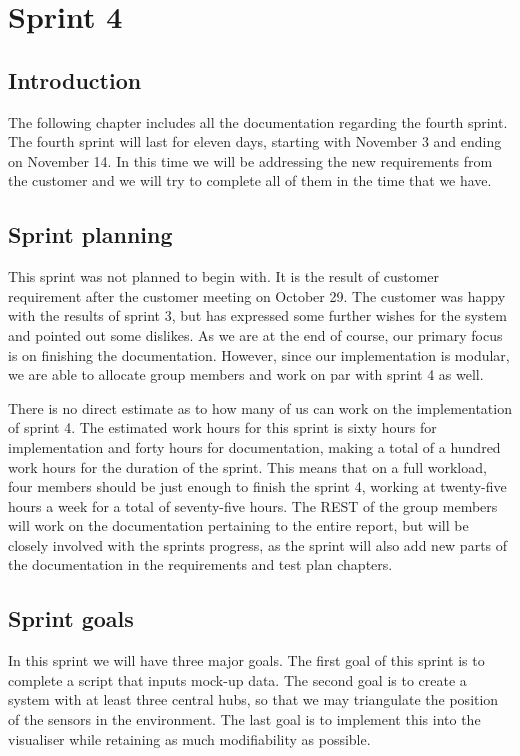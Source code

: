 \documentclass[../document]{subfiles}
\begin{document}
\section{Sprint 4}

\subsection{Introduction}

The following chapter includes all the documentation regarding the fourth sprint. The fourth sprint will last for eleven days, starting with November 3 and ending on November 14. In this time we will be addressing the new requirements from the customer and we will try to complete all of them in the time that we have. 

\subsection{Sprint planning}

This sprint was not planned to begin with. It is the result of customer requirement after the customer meeting on October 29. The customer was happy with the results of sprint 3, but has expressed some further wishes for the system and pointed out some dislikes. As we are at the end of course, our primary focus is on finishing the documentation. However, since our implementation is modular, we are able to allocate group members and work on par with sprint 4 as well.

There is no direct estimate as to how many of us can work on the implementation of sprint 4. The estimated work hours for this sprint is sixty hours for implementation and forty hours for documentation, making a total of a hundred work hours for the duration of the sprint. This means that on a full workload, four members should be just enough to finish the sprint 4, working at twenty-five hours a week for a total of seventy-five hours. The \gls{REST} of the group members will work on the documentation pertaining to the entire report, but will be closely involved with the sprints progress, as the sprint will also add new parts of the documentation in the requirements and test plan chapters.

\subsection{Sprint goals}

In this sprint we will have three major goals. The first goal of this sprint is to complete a script that inputs mock-up data. The second goal is to create a system with at least three central hubs, so that we may triangulate the position of the sensors in the environment. The last goal is to implement this into the visualiser while retaining as much modifiability as possible.
\end{document}
